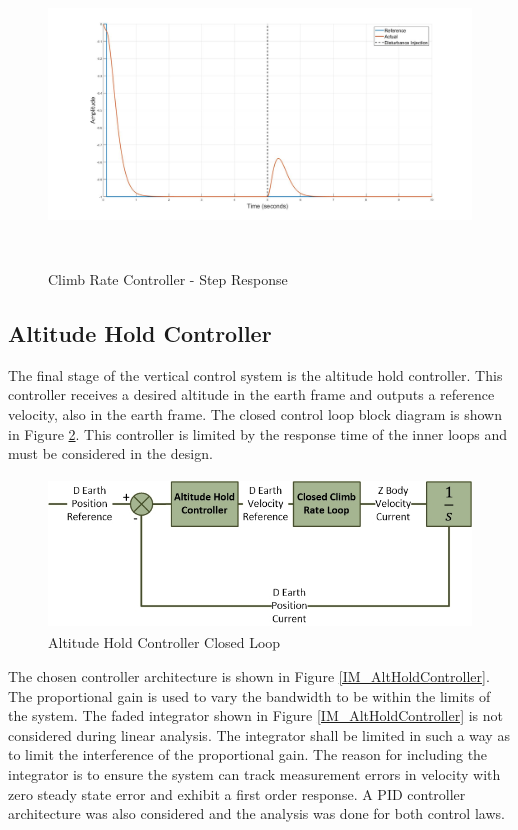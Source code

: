 \documentclass[12pt]{report}
\begin{document}
	\begin{figure}[H]
		\centering
		\includegraphics[height = 8cm]{../Design/Matlab/Controllers/climb_rate_step.jpg}
		\caption{Climb Rate Controller -  Step Response}
		\label{IM_ClimbRateStep}
	\end{figure}
	
	\subsection{Altitude Hold Controller}
	The final stage of the vertical control system is the altitude hold controller. This controller receives a desired altitude in the earth frame and outputs a reference velocity, also in the earth frame. The closed control loop block diagram is shown in Figure \ref{IM_AltHoldControlLoop}. This controller is limited by the response time of the inner loops and must be considered in the design.
	
	\begin{figure}[H]
		\centering
		\includegraphics[height = 4cm]{../References/Diagrams/AltHoldLoop.jpg}
		\caption{Altitude Hold Controller Closed Loop}
		\label{IM_AltHoldControlLoop}
	\end{figure}
	
	The chosen controller architecture is shown in Figure \ref{IM_AltHoldController}. The proportional gain is used to vary the bandwidth to be within the limits of the system. The faded integrator shown in Figure \ref{IM_AltHoldController} is not considered during linear analysis. The integrator shall be limited in such a way as to limit the interference of the proportional gain. The reason for including the integrator is to ensure the system can track measurement errors in velocity with zero steady state error and exhibit a first order response. A PID controller architecture was also considered and the analysis was done for both control laws.
	
\end{document}
